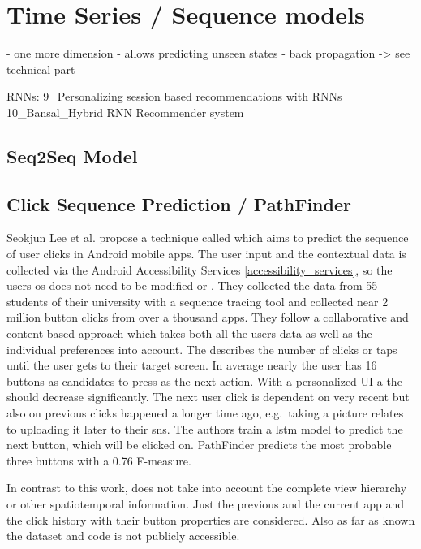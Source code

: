 
\section{Time Series / Sequence models}

- one more dimension
- allows predicting unseen states
- back propagation -> see technical part
-

RNNs: 9\_Personalizing session based recommendations with RNNs \cite{quadrana2017personalizing}
10\_Bansal\_Hybrid RNN Recommender system \cite{bansal2022remembering}
\cite{pietro2022recommendationSystems}

\subsection{Seq2Seq Model}
\cite{chollet2017seq2seq}

\subsection{Click Sequence Prediction / PathFinder}

Seokjun Lee et al. \cite{lee2018click} propose a technique called  which aims to predict the sequence of user clicks in Android mobile apps.
The user input and the contextual data is collected via the Android Accessibility Services \ref{accessibility_services}, so the users \gls{os} does not need to be modified or .
They collected the data from 55 students of their university with a sequence tracing tool and collected near 2 million button clicks from over a thousand apps.
They follow a collaborative and content-based approach which takes both all the users data as well as the individual preferences into account.
The  describes the number of clicks or taps until the user gets to their target screen.
In average nearly the user has 16 buttons as candidates to press as the next action.
With a personalized UI a the  should decrease significantly.
The next user click is dependent on very recent but also on previous clicks happened a longer time ago, e.g.~taking a picture relates to uploading it later to their \gls{sns}.
The authors train a \gls{lstm} model to predict the next button, which will be clicked on.
PathFinder predicts the most probable three buttons with a 0.76 F-measure.

In contrast to this work,  does not take into account the complete view hierarchy or other spatiotemporal information.
Just the previous and the current app and the click history with their button properties are considered.
Also as far as known the dataset and code is not publicly accessible.

